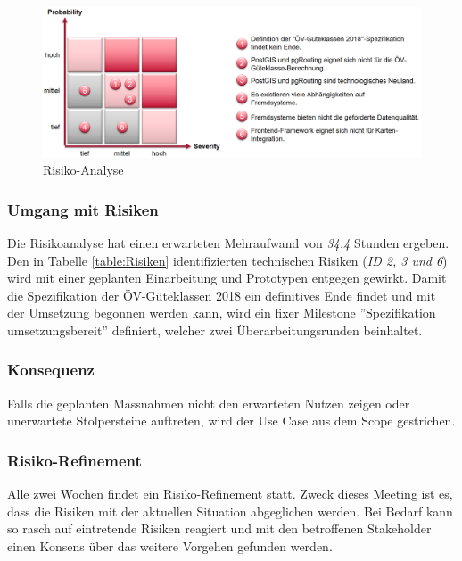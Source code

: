 \begin{figure}[ht]
    \centering
    \includegraphics[width=1.0\linewidth]{projectdoc/img/risk_analysis}
    \caption[Risiko-Analyse]{Risiko-Analyse}
    \label{fig:risk_analysis}
\end{figure}

\subsubsection{Umgang mit Risiken}
\label{Risiken:Umang mit Risiken}

Die Risikoanalyse hat einen erwarteten Mehraufwand von \emph{34.4} Stunden ergeben.
Den in Tabelle \ref{table:Risiken} identifizierten technischen Risiken (\emph{ID 2, 3 und 6}) wird mit einer geplanten Einarbeitung und Prototypen entgegen gewirkt.
Damit die Spezifikation der \acs{ÖV}-Güteklassen 2018 ein definitives Ende findet und mit der Umsetzung begonnen werden kann, wird ein fixer Milestone ''Spezifikation umsetzungsbereit'' definiert, welcher zwei Überarbeitungsrunden beinhaltet.

\subsubsection{Konsequenz}
\label{Risiken:Konsequenz}

Falls die geplanten Massnahmen nicht den erwarteten Nutzen zeigen oder unerwartete Stolpersteine auftreten, wird der Use Case  aus dem Scope gestrichen.

\subsubsection{Risiko-Refinement}
\label{Risiken:Risiko-Refinement}

Alle zwei Wochen findet ein Risiko-Refinement statt.
Zweck dieses Meeting ist es, dass die Risiken mit der aktuellen Situation abgeglichen werden.
Bei Bedarf kann so rasch auf eintretende Risiken reagiert und mit den betroffenen Stakeholder einen Konsens über das weitere Vorgehen gefunden werden.

